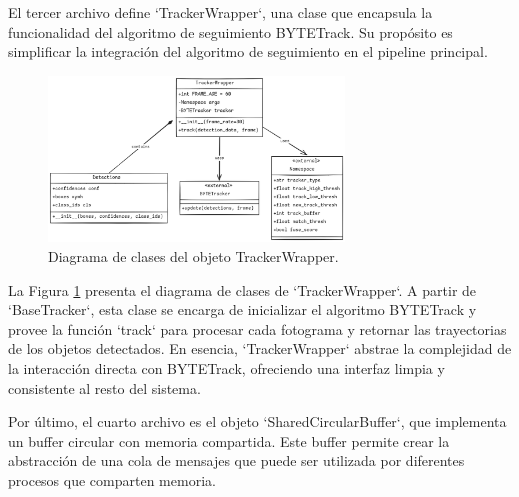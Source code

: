 \documentclass[11pt,spanish,listoffigures,listoftables]{tfgetsinf}
\begin{document}
   


   El tercer archivo define `TrackerWrapper`, una clase que encapsula la funcionalidad del algoritmo de seguimiento BYTETrack. Su propósito es simplificar la integración del algoritmo de seguimiento en el pipeline principal.

   \begin{figure}[H]
      \centering
      \includegraphics[width=0.7\textwidth]{codigo/images/tracker_wrapper_uml.png}
      \caption[Diagrama de clases del objeto TrackerWrapper]{Diagrama de clases del objeto TrackerWrapper.}
      \label{fig:tracker_wrapper_uml}
   \end{figure}

   La Figura \ref{fig:tracker_wrapper_uml} presenta el diagrama de clases de `TrackerWrapper`. A partir de `BaseTracker`, esta clase se encarga de inicializar el algoritmo BYTETrack y provee la función `track` para procesar cada fotograma y retornar las trayectorias de los objetos detectados. En esencia, `TrackerWrapper` abstrae la complejidad de la interacción directa con BYTETrack, ofreciendo una interfaz limpia y consistente al resto del sistema.

   

   Por último, el cuarto archivo es el objeto `SharedCircularBuffer`, que implementa un buffer circular con memoria compartida. Este buffer permite crear la abstracción de una cola de mensajes que puede ser utilizada por diferentes procesos que comparten memoria. 
\end{document}

